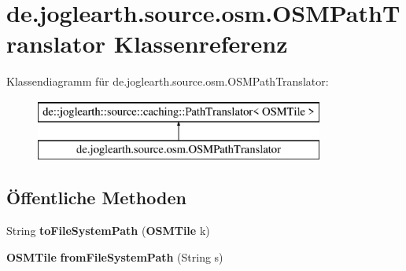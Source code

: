 \section{de.\-joglearth.\-source.\-osm.\-O\-S\-M\-Path\-Translator Klassenreferenz}
\label{classde_1_1joglearth_1_1source_1_1osm_1_1_o_s_m_path_translator}
Klassendiagramm für de.\-joglearth.\-source.\-osm.\-O\-S\-M\-Path\-Translator\-:\begin{figure}[H]
\begin{center}
\leavevmode
\includegraphics[height=2.000000cm]{classde_1_1joglearth_1_1source_1_1osm_1_1_o_s_m_path_translator}
\end{center}
\end{figure}
\subsection*{Öffentliche Methoden}
\begin{DoxyCompactItemize}
\item 
String {\bfseries to\-File\-System\-Path} ({\bf O\-S\-M\-Tile} k)\label{classde_1_1joglearth_1_1source_1_1osm_1_1_o_s_m_path_translator_a2bd303d6f40581fd5409047569441725}

\item 
{\bf O\-S\-M\-Tile} {\bfseries from\-File\-System\-Path} (String s)\label{classde_1_1joglearth_1_1source_1_1osm_1_1_o_s_m_path_translator_a9b1c06866ae1e7c1def9a535d0dda798}

\end{DoxyCompactItemize}
